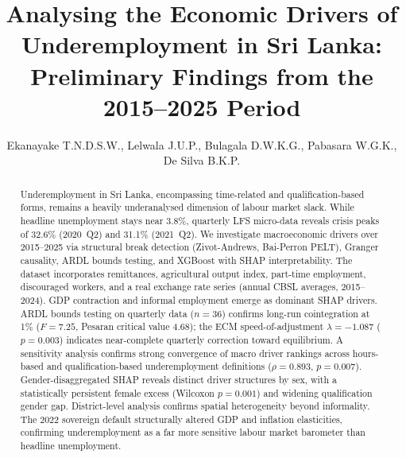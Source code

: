 \documentclass[sigconf]{acmart}
\begin{document}
\title{Analysing the Economic Drivers of Underemployment in Sri Lanka: Preliminary Findings from the 2015--2025 Period}

\author{
Ekanayake T.N.D.S.W.,
Lelwala J.U.P.,
Bulagala D.W.K.G.,
Pabasara W.G.K.,
De Silva B.K.P.
}



\begin{abstract}
Underemployment in Sri Lanka, encompassing time-related and
qualification-based forms, remains a heavily underanalysed dimension of
labour market slack. While headline unemployment stays near 3.8\%, quarterly
LFS micro-data reveals crisis peaks of 32.6\% (2020~Q2) and 31.1\%
(2021~Q2). We investigate macroeconomic drivers over 2015--2025 via
structural break detection (Zivot-Andrews, Bai-Perron PELT), Granger
causality, ARDL bounds testing, and XGBoost with SHAP interpretability.
The dataset incorporates remittances, agricultural output index,
part-time employment, discouraged workers, and a real exchange rate series
(annual CBSL averages, 2015--2024). GDP contraction and informal employment
emerge as dominant SHAP drivers. ARDL bounds testing on quarterly data
($n{=}36$) confirms long-run cointegration at 1\% ($F{=}7.25$, Pesaran
critical value 4.68); the ECM speed-of-adjustment $\lambda{=}{-1.087}$
($p{=}0.003$) indicates near-complete quarterly correction toward
equilibrium. A sensitivity analysis confirms strong convergence of macro
driver rankings across hours-based and qualification-based underemployment
definitions ($\rho = 0.893$, $p = 0.007$). Gender-disaggregated SHAP
reveals distinct driver structures by sex, with a statistically persistent
female excess (Wilcoxon $p = 0.001$) and widening qualification gender gap.
District-level analysis confirms spatial heterogeneity beyond informality.
The 2022 sovereign default structurally altered GDP and inflation
elasticities, confirming underemployment as a far more sensitive labour
market barometer than headline unemployment.
\end{abstract}


\maketitle
\end{document}
